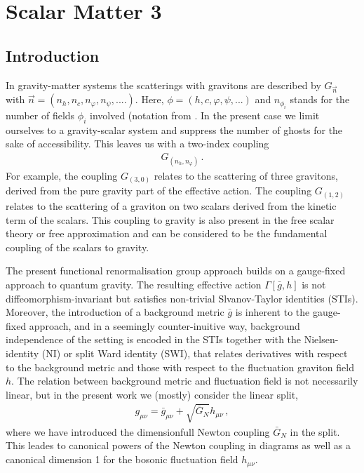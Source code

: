 \documentclass[11pt]{book} %
\numberwithin{equation}{chapter}
\begin{document}

\chapter{Scalar Matter 3}
\label{ch:jan}

\section{Introduction}
In gravity-matter systems the scatterings with gravitons are described
by $G_{\vec n}$ with $\vec n=(n_h, n_c,n_\varphi,n_\psi,....)$. Here,
$\phi=(h,c,\varphi,\psi,...)$ and $n_{\phi_i}$ stands for the number
of fields $\phi_i$ involved (notation from \cite{Meibohm:2016mkp} . In
the present case we limit ourselves to a gravity-scalar system and
suppress the number of ghosts for the sake of accessibility. This
leaves us with a two-index coupling
\begin{align}
G_{(n_h,n_\varphi)}\,.
\end{align}
For example, the coupling $G_{(3, 0)}$ relates to the scattering of
three gravitons, derived from the pure gravity part of the effective
action. The coupling $G_{(1,2)}$ relates to the scattering of a
graviton on two scalars derived from the kinetic term of the
scalars. This coupling to gravity is also present in the free scalar
theory or free approximation and can be considered to be the
fundamental coupling of the scalars to gravity.

The present functional renormalisation group approach builds on a
gauge-fixed approach to quantum gravity. The resulting effective
action $\Gamma[\bar g,h]$ is not diffeomorphism-invariant but
satisfies non-trivial Slvanov-Taylor identities (STIs). Moreover, the
introduction of a background metric $\bar g$ is inherent to the
gauge-fixed approach, and in a seemingly counter-inuitive way,
background independence of the setting is encoded in the STIs together
with the Nielsen-identity (NI) or split Ward identity (SWI), that
relates derivatives with respect to the background metric and those
with respect to the fluctuation graviton field $h$. The relation
between background metric and fluctuation field is not necessarily
linear, but in the present work we (mostly) consider the linear split,
\begin{align}\label{eq:linpara}
  g_{\mu \nu}=\bar g_{\mu \nu}+ \sqrt{\bar{G}_N} h_{\mu \nu}\,,
\end{align}
where we have introduced the dimensionfull Newton coupling $\bar{G}_N$ in the split. This
leades to canonical powers of the Newton coupling in diagrams as well
as a canonical dimension 1 for the bosonic fluctuation field $h_{\mu \nu}$.
\end{document}
